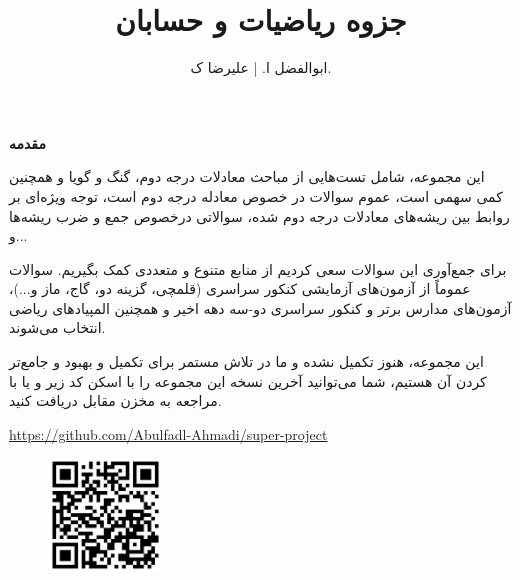 \documentclass[11pt]{book}
\title{ جزوه ریاضیات و حسابان}
\author{ابوالفضل ا. | علیرضا ک.}
\newcommand{\sol}{\bigskip \bigskip \bigskip \bigskip \bigskip \bigskip }
\begin{document}
\maketitle

\thispagestyle{empty}

\bigskip



\begin{center}
	\begin{minipage}{17cm}
{\large 
	\setlength{\parindent}{1.5em}
	
	\textbf{{\huge مقدمه }}\bigskip
	
	\indent
این مجموعه، شامل تست‌هایی از مباحث معادلات درجه دوم، گنگ و گویا و همچنین کمی سهمی است، عموم سوالات در خصوص معادله درجه دوم است، توجه ویژه‌ای بر روابط بین ریشه‌های معادلات درجه دوم شده، سوالاتی درخصوص جمع و ضرب ریشه‌ها و...
\smallskip

برای جمع‌آوری این سوالات سعی کردیم از منابع متنوع و متعددی کمک بگیریم. سوالات عموماً از آزمون‌های آزمایشی کنکور سراسری (قلمچی، گزینه دو، گاج، ماز و...)، آزمون‌های مدارس برتر و کنکور سراسری دو-سه دهه اخیر و همچنین المپیادهای ریاضی انتخاب می‌شوند.\smallskip

این مجموعه، هنوز تکمیل نشده و ما در تلاش مستمر برای تکمیل و بهبود و جامع‌تر کردن‌ آن هستیم، شما می‌توانید آخرین نسخه این مجموعه را با اسکن کد زیر و یا با مراجعه به مخزن مقابل 
دریافت کنید. 

\hfill
	\url{https://github.com/Abulfadl-Ahmadi/super-project}

}\end{minipage}
\end{center}


\sol 

\begin{figure}[bp]
\begin{center}
	\includegraphics[width=3cm]{../Image/QrCode/github-page}
\end{center}

\bigskip

\hfill 
\end{figure}

\newpage

\clearpage
{}
	
\end{document}
